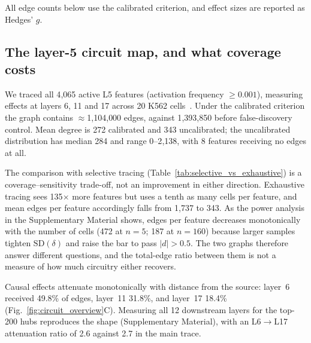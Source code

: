 \documentclass[11pt,onecolumn]{article}
\begin{document}
All edge counts below use the calibrated criterion, and effect sizes are reported as Hedges' $g$.

\subsection{The layer-5 circuit map, and what coverage costs}

We traced all 4{,}065 active L5 features (activation frequency $\geq 0.001$), measuring effects at layers 6, 11 and 17 across 20 K562 cells~\citep{replogle2022mapping}. Under the calibrated criterion the graph contains $\approx$1{,}104{,}000 edges, against 1{,}393{,}850 before false-discovery control. Mean degree is 272 calibrated and 343 uncalibrated; the uncalibrated distribution has median 284 and range 0--2{,}138, with 8 features receiving no edges at all.

The comparison with selective tracing (Table~\ref{tab:selective_vs_exhaustive}) is a coverage--sensitivity trade-off, not an improvement in either direction. Exhaustive tracing sees 135$\times$ more features but uses a tenth as many cells per feature, and mean edges per feature accordingly falls from 1{,}737 to 343. As the power analysis in the Supplementary Material shows, edges per feature decreases monotonically with the number of cells (472 at $n=5$; 187 at $n=160$) because larger samples tighten $\mathrm{SD}(\delta)$ and raise the bar to pass $|d|>0.5$. The two graphs therefore answer different questions, and the total-edge ratio between them is not a measure of how much circuitry either recovers.

Causal effects attenuate monotonically with distance from the source: layer~6 received 49.8\% of edges, layer~11 31.8\%, and layer~17 18.4\% (Fig.~\ref{fig:circuit_overview}C). Measuring all 12 downstream layers for the top-200 hubs reproduces the shape (Supplementary Material), with an L6$\to$L17 attenuation ratio of 2.6 against 2.7 in the main trace.
\end{document}
